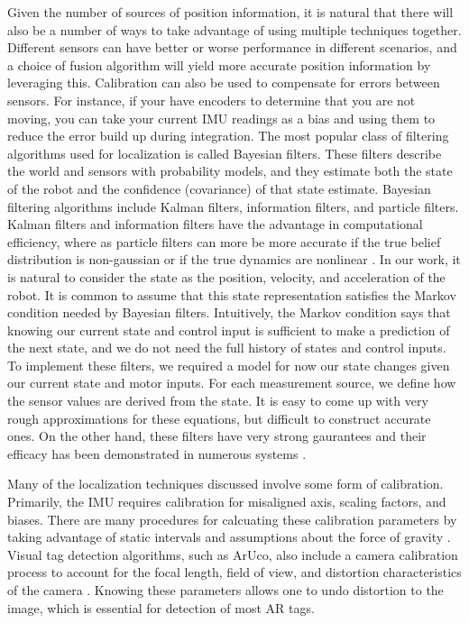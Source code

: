 \documentclass{article}
\begin{document}
    Given the number of sources of position information, it is natural that there will also be a number of ways to take advantage of using multiple techniques together. Different sensors can have better or worse performance in different scenarios, and a choice of fusion algorithm will yield more accurate position information by leveraging this. Calibration can also be used to compensate for errors between sensors. For instance, if your have encoders to determine that you are not moving, you can take your current IMU readings as a bias and using them to reduce the error build up during integration. The most popular class of filtering algorithms used for localization is called Bayesian filters. These filters describe the world and sensors with probability models, and they estimate both the state of the robot and the confidence (covariance) of that state estimate. Bayesian filtering algorithms include Kalman filters, information filters, and particle filters. Kalman filters and information filters have the advantage in computational efficiency, where as particle filters can more be more accurate if the true belief distribution is non-gaussian or if the true dynamics are nonlinear \cite{thrun_probabilistic_2005}. In our work, it is natural to consider the state as the position, velocity, and acceleration of the robot. It is common to assume that this state representation satisfies the Markov condition needed by Bayesian filters. Intuitively, the Markov condition says that knowing our current state and control input is sufficient to make a prediction of the next state, and we do not need the full history of states and control inputs. To implement these filters, we required a model for now our state changes given our current state and motor inputs. For each measurement source, we define how the sensor values are derived from the state. It is easy to come up with very rough approximations for these equations, but difficult to construct accurate ones. On the other hand, these filters have very strong gaurantees and their efficacy has been demonstrated in numerous systems \cite{chui_kalman_1991}\cite{digiampaolo_mobile_2014}\cite{mirzaei_kalman_2008}\cite{nasa_kalman_1999}\cite{saab_standalone_2011}.

    Many of the localization techniques discussed involve some form of calibration. Primarily, the IMU requires calibration for misaligned axis, scaling factors, and biases. There are many procedures for calcuating these calibration parameters by taking advantage of static intervals and assumptions about the force of gravity \cite{lupton_visual-inertial-aided_2012}\cite{lee_test_2011}\cite{tedaldi_robust_2014}. Visual tag detection algorithms, such as ArUco, also include a camera calibration process to account for the focal length, field of view, and distortion characteristics of the camera \cite{itseez_calibration_2017}. Knowing these parameters allows one to undo distortion to the image, which is essential for detection of most AR tags.
\end{document}
